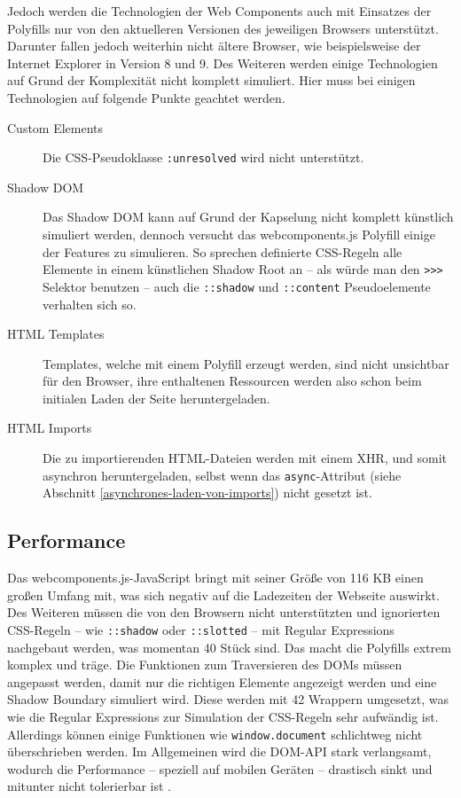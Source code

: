 Jedoch werden die Technologien der Web Components auch mit Einsatzes der Polyfills nur von den aktuelleren Versionen des jeweiligen Browsers unterstützt. Darunter fallen jedoch weiterhin nicht ältere Browser, wie beispielsweise der Internet Explorer in Version 8 und 9. Des Weiteren werden einige Technologien auf Grund der Komplexität nicht komplett simuliert. Hier muss bei einigen Technologien auf folgende Punkte geachtet werden.

\begin{description}
  \item[Custom Elements] Die \ac{CSS}-Pseudoklasse \texttt{:unresolved} wird nicht unterstützt.
  \item[Shadow \ac{DOM}] Das Shadow \ac{DOM} kann auf Grund der Kapselung nicht komplett künstlich simuliert werden, dennoch versucht das webcomponents.js Polyfill einige der Features zu simulieren. So sprechen definierte \ac{CSS}-Regeln alle Elemente in einem künstlichen Shadow Root an -- als würde man den \texttt{\textgreater{}\textgreater{}\textgreater{}} Selektor benutzen -- auch die \texttt{::shadow} und \texttt{::content} Pseudoelemente verhalten sich so.
  \item[\ac{HTML} Templates] Templates, welche mit einem Polyfill erzeugt werden, sind nicht unsichtbar für den Browser, ihre enthaltenen Ressourcen werden also schon beim initialen Laden der Seite heruntergeladen.
  \item[\ac{HTML} Imports] Die zu importierenden \ac{HTML}-Dateien werden mit einem \ac{XHR}, und somit asynchron heruntergeladen, selbst wenn das \texttt{async}-Attribut (siehe Abschnitt \ref{asynchrones-laden-von-imports}) nicht gesetzt ist.
\end{description}


\subsection{Performance}\label{performance}

Das webcomponents.js-JavaScript \cite{citeulike:13914238} bringt mit seiner Größe von 116 KB einen großen Umfang mit, was sich negativ auf die Ladezeiten der Webseite auswirkt. Des Weiteren müssen die von den Browsern nicht unterstützten und ignorierten \ac{CSS}-Regeln -- wie \texttt{::shadow} oder \texttt{::slotted} -- mit Regular Expressions nachgebaut werden, was momentan 40 Stück sind. Das macht die Polyfills extrem komplex und träge. Die Funktionen zum Traversieren des \ac{DOM}s müssen angepasst werden, damit nur die richtigen Elemente angezeigt werden und eine Shadow Boundary simuliert wird. Diese werden mit 42 Wrappern umgesetzt, was wie die Regular Expressions zur Simulation der \ac{CSS}-Regeln sehr aufwändig ist. Allerdings können einige Funktionen wie \texttt{window.document} schlichtweg nicht überschrieben werden. Im Allgemeinen wird die \ac{DOM}-\ac{API} stark verlangsamt, wodurch die Performance -- speziell auf mobilen Geräten -- drastisch sinkt und mitunter nicht tolerierbar ist \cite{citeulike:13886251}.


